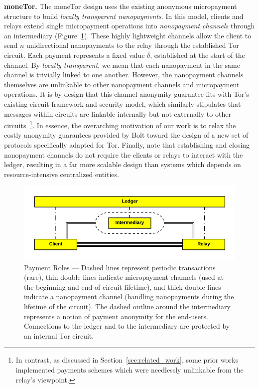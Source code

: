 \medskip \noindent\textbf{moneTor.} The moneTor design uses the existing anonymous micropayment structure to build \emph{locally transparent nanopayments}.
In this model, clients and relays extend single micropayment operations into \emph{nanopayment channels} through an intermediary (Figure~\ref{fig:parties}).
These highly lightweight channels allow the client to send $n$ unidirectional nanopayments to the relay through the established Tor circuit.
Each payment represents a fixed value $\delta$, established at the start of the channel.
By \emph{locally transparent}, we mean that each nanopayment in the same channel is trivially linked to one another.
However, the nanopayment channels themselves are unlinkable to other nanopayment channels and micropayment operations.
It is by design that this channel anonymity guarantee fits with Tor's existing circuit framework and security model, which similarly stipulates that messages within circuits are linkable internally but not externally to other circuits~\footnote{In contrast, as discussed in Section~\ref{sec:related_work}, some prior works implemented payments schemes which were needlessly unlinkable from the relay's viewpoint.}.
In essence, the overarching motivation of our work is to relax the costly anonymity guarantees provided by Bolt toward the design of a new set of protocols specifically adapted for Tor.
Finally, note that establishing and closing nanopayment channels do not require the clients or relays to interact with the ledger, resulting in a far more scalable design than systems which depends on resource-intensive centralized entities.

\begin{figure}[h] \centering
  \includegraphics[trim={0.5cm, 0.5cm, 0.5cm, 0.5cm}, clip,
    scale=0.6]{images/party_diagram.pdf}
  \caption[Payment Roles]{Payment Roles --- Dashed lines represent periodic transactions (rare), thin double lines indicate micropayment channels (used at the beginning and end of circuit lifetime), and thick double lines indicate a nanopayment channel (handling nanopayments during the lifetime of the circuit).
    The dashed outline around the intermediary represents a notion of payment anonymity for the end-users.
    Connections to the ledger and to the intermediary are protected by an internal Tor circuit.}
  \label{fig:parties}
\end{figure}

